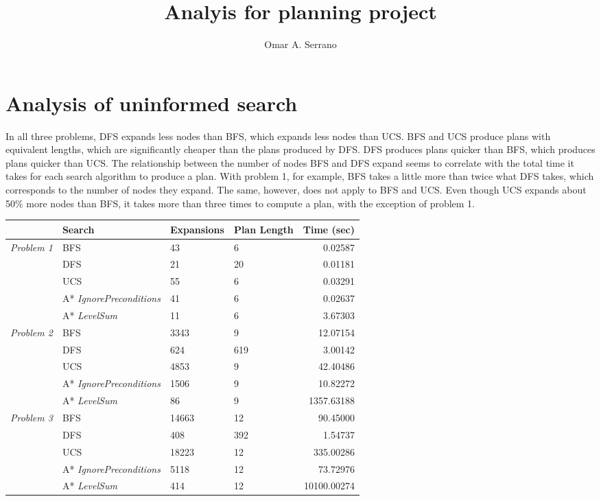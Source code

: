 \documentclass[10pt,a4paper]{article}
\title{Analyis for planning project}
\author{Omar A. Serrano}
\begin{document}
\maketitle

\section*{Analysis of uninformed search}

In all three problems, DFS expands less nodes than BFS, which expands less nodes
than UCS. BFS and UCS produce plans with equivalent lengths, which are
significantly cheaper than the plans produced by DFS. DFS produces plans quicker
than BFS, which produces plans quicker than UCS. The relationship between the
number of nodes BFS and DFS expand seems to correlate with the total time it
takes for each search algorithm to produce a plan. With problem 1, for example,
BFS takes a little more than twice what DFS takes, which corresponds to the
number of nodes they expand. The same, however, does not apply to BFS and UCS.
Even though UCS expands about 50\% more nodes than BFS, it takes more than three
times to compute a plan, with the exception of problem 1.

\hfill \break

\begin{tabular}{|c|l|l|l|r|}
    \hline
    & \textbf{Search} & \textbf{Expansions}
    & \textbf{Plan Length} & \textbf{Time (sec)} \\
    \hline
    \multirow{4}{*}{\textit{Problem 1}} & BFS & 43 & 6 & 0.02587 \\
    \cline{2-5}
    & DFS & 21 & 20 & 0.01181 \\
    \cline{2-5}
    & UCS & 55 & 6 & 0.03291 \\
    \cline{2-5}
    & A* \textit{IgnorePreconditions} & 41 & 6 & 0.02637 \\
    \cline{2-5}
    & A* \textit{LevelSum} & 11 & 6 & 3.67303 \\
    \hline
    \multirow{4}{*}{\textit{Problem 2}} & BFS & 3343 & 9 & 12.07154 \\
    \cline{2-5}
    & DFS & 624 & 619 & 3.00142 \\
    \cline{2-5}
    & UCS & 4853 & 9 & 42.40486 \\
    \cline{2-5}
    & A* \textit{IgnorePreconditions} & 1506 & 9 & 10.82272 \\
    \cline{2-5}
    & A* \textit{LevelSum} & 86 & 9 & 1357.63188 \\
    \hline
    \multirow{4}{*}{\textit{Problem 3}} & BFS & 14663 & 12 & 90.45000 \\
    \cline{2-5}
    & DFS & 408 & 392 & 1.54737 \\
    \cline{2-5}
    & UCS & 18223 & 12 & 335.00286 \\
    \cline{2-5}
    & A* \textit{IgnorePreconditions} & 5118 & 12 & 73.72976 \\
    \cline{2-5}
    & A* \textit{LevelSum} & 414 & 12 & 10100.00274 \\
    \hline
\end{tabular}
\end{document}
